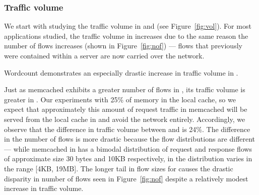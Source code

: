 \subsubsection{Traffic volume}
\label{sssec:tfvol}
We start with studying the traffic volume in \dis and \pdis (see Figure~\ref{fig:vol}). For most applications studied, the traffic volume in \dis increases due to the same reason the number of flows increases (shown in Figure~\ref{fig:nof}) --- flows that previously were contained within a server are now carried over the network.

Wordcount demonstrates an especially drastic increase in traffic volume in \dis. 

Just as memcached exhibits a greater number of flows in \pdis, its traffic volume is greater in \dis. Our experiments with 25\% of memory in the local cache, so we expect that approximately this amount of request traffic in memcached will be served from the local cache in \dis and avoid the network entirely. Accordingly, we observe that the difference in traffic volume between \dis and \pdis is 24\%. The difference in the number of flows is more drastic because the flow distributions are different --- while memcached in \pdis has a bimodal distribution of request and response flows of approximate size 30 bytes and 10KB respectively, in \dis the distribution varies in the range [4KB, 19MB]. The longer tail in flow sizes for \dis causes the drastic disparity in number of flows seen in Figure~\ref{fig:nof} despite a relatively modest increase in traffic volume.


